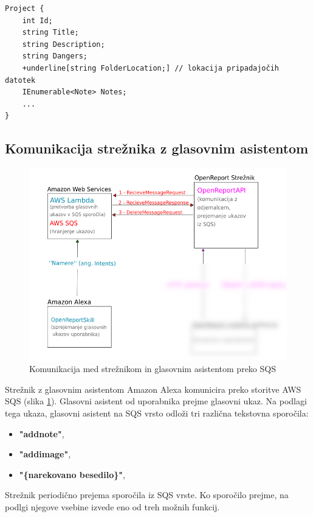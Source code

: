 \documentclass[a4paper, 12pt]{book}
\begin{document}
\begin{Verbatim}[commandchars=+\[\]]
Project {
    int Id; 
    string Title; 
    string Description; 
    string Dangers; 
    +underline[string FolderLocation;] // lokacija pripadajočih datotek 
    IEnumerable<Note> Notes; 
    ... 
}
\end{Verbatim}

\subsection{Komunikacija strežnika z glasovnim asistentom}

\begin{figure}[H]
\begin{center}
\includegraphics[width=13cm]{plan_sqs_server_alexa}
\end{center}
\caption{Komunikacija med strežnikom in glasovnim asistentom preko SQS}
\label{plan_sqs_server_alexa}
\end{figure}

Strežnik z glasovnim asistentom Amazon Alexa komunicira preko storitve AWS SQS (slika \ref{plan_sqs_server_alexa}).
Glasovni asistent od uporabnika prejme glasovni ukaz.
Na podlagi tega ukaza, glasovni asistent na SQS vrsto odloži tri različna tekstovna sporočila:
\begin{itemize}
	\item \textbf{"addnote"},
	\item \textbf{"addimage"},
	\item \textbf{"\{narekovano besedilo\}"},
\end{itemize}

Strežnik periodično prejema sporočila iz SQS vrste.
Ko sporočilo prejme, na podlgi njegove vsebine izvede eno od treh možnih funkcij.
\end{document}
